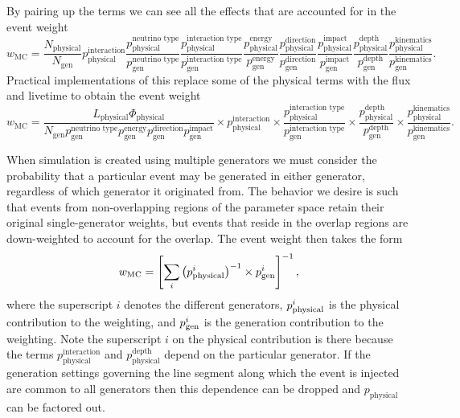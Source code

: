 \documentclass[main.tex]{subfiles}
\begin{document}
By pairing up the terms we can see all the effects that are accounted for in the event weight
\begin{equation}
w_\textrm{MC} = \frac{N_\textrm{physical}}{N_\textrm{gen}} p_\textrm{physical}^\textrm{interaction} \frac{p_\textrm{physical}^\textrm{neutrino type}}{p_\textrm{gen}^\textrm{neutrino type}} \frac{p_\textrm{physical}^\textrm{interaction type}}{p_\textrm{gen}^\textrm{interaction type}} \frac{p_\textrm{physical}^\textrm{energy}}{p_\textrm{gen}^\textrm{energy}} \frac{p_\textrm{physical}^\textrm{direction}}{p_\textrm{gen}^\textrm{direction}} \frac{p_\textrm{physical}^\textrm{impact}}{p_\textrm{gen}^\textrm{impact}} \frac{p_\textrm{physical}^\textrm{depth}}{p_\textrm{gen}^\textrm{depth}} \frac{p_\textrm{physical}^\textrm{kinematics}}{p_\textrm{gen}^\textrm{kinematics}}.
\end{equation}
Practical implementations of this replace some of the physical terms with the flux and livetime to obtain the event weight
\begin{equation}
w_\textrm{MC} = \frac{L_\textrm{physical}\Phi_\textrm{physical}}{N_\textrm{gen} p_\textrm{gen}^\textrm{neutrino type} p_\textrm{gen}^\textrm{energy} p_\textrm{gen}^\textrm{direction} p_\textrm{gen}^\textrm{impact}} \times p_\textrm{physical}^\textrm{interaction} \times \frac{p_\textrm{physical}^\textrm{interaction type}}{p_\textrm{gen}^\textrm{interaction type}} \times \frac{p_\textrm{physical}^\textrm{depth}}{p_\textrm{gen}^\textrm{depth}} \times \frac{p_\textrm{physical}^\textrm{kinematics}}{p_\textrm{gen}^\textrm{kinematics}}.
\end{equation}

When simulation is created using multiple generators we must consider the probability that a particular event may be generated in either generator, regardless of which generator it originated from.
The behavior we desire is such that events from non-overlapping regions of the parameter space retain their original single-generator weights, but events that reside in the overlap regions are down-weighted to account for the overlap.
The event weight then takes the form
\begin{equation}
w_\textmd{MC} = \left[\sum_i \left(p_\textmd{physical}^{i}\right)^{-1} \times p_\textmd{gen}^{i}\right]^{-1},
\end{equation}
where the superscript $i$ denotes the different generators, $p_\textmd{physical}^{i}$ is the physical contribution to the weighting, and $p_\textmd{gen}^{i}$ is the generation contribution to the weighting.
Note the superscript $i$ on the physical contribution is there because the terms $p_\textrm{physical}^\textrm{interaction}$ and $p_\textrm{physical}^\textrm{depth}$ depend on the particular generator.
If the generation settings governing the line segment along which the event is injected are common to all generators then this dependence can be dropped and $p_\textrm{physical}$ can be factored out.
\end{document}
